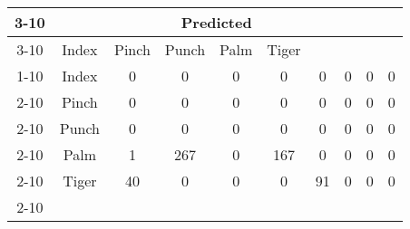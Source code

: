 \documentclass{standalone}
\begin{document}
 
 \begin{tabular}{|c |c |c |c |c |c |c |c |c |c |}
\cline{3-10}\multicolumn{2}{c|}{} & \multicolumn{8}{c|}{Predicted} \\ 
\cline{3-10} \multicolumn{2}{c |}{ } & Index & Pinch & Punch & Palm & Tiger\\ 
\cline{1-10}\multirow{8}{*}{\rotatebox[origin=c]{90}{Actual}} & Index & 0 & 0 & 0 & 0 & 0 & 0 & 0 & 0\\ 
 \cline{2-10} & Pinch & 0 & 0 & 0 & 0 & 0 & 0 & 0 & 0\\ 
 \cline{2-10} & Punch & 0 & 0 & 0 & 0 & 0 & 0 & 0 & 0\\ 
 \cline{2-10} & Palm & 1 & 267 & 0 & 167 & 0 & 0 & 0 & 0\\ 
 \cline{2-10} & Tiger & 40 & 0 & 0 & 0 & 91 & 0 & 0 & 0\\ 
 \cline{2-10}\hline \end{tabular}
 
\end{document}
